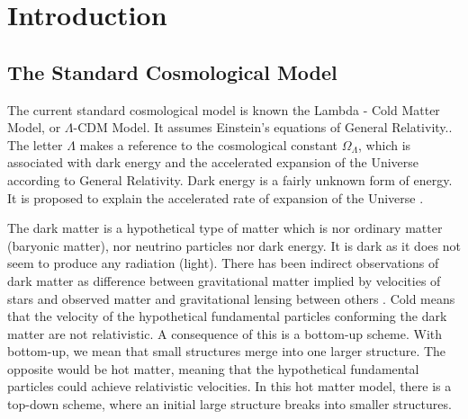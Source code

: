 \documentclass[12pt]{article}
\begin{document}
\section{Introduction}
\subsection{The Standard Cosmological Model}
\label{cosmo_constants}

\begin{par}

The current standard cosmological model is known the Lambda
 - Cold Matter Model, or $\Lambda$-CDM Model. It assumes Einstein's equations of General Relativity.\cite{bertone_particle_2005}.\\
The
  letter $\Lambda$ makes a reference to the
   cosmological constant $\Omega_{\Lambda}$, which is
    associated with dark energy and the accelerated
     expansion of the Universe according to General
      Relativity. Dark energy is a fairly unknown form of
       energy. It is proposed to explain the accelerated
        rate of expansion of the Universe
         \cite{peebles_cosmological_2003}.
      
The dark matter is a hypothetical type of matter which is
 nor ordinary matter (baryonic matter), nor neutrino
  particles nor dark energy. It is dark as it does not
   seem to produce any radiation (light). There has been
    indirect observations of dark matter as difference
     between gravitational matter implied by velocities
      of stars and observed matter and gravitational
       lensing between others
        \cite{trimble_existence_1987}. Cold means that
         the velocity of the hypothetical fundamental
          particles conforming the dark matter are not
           relativistic. A consequence of this is a
            bottom-up scheme. With bottom-up, we mean
             that small structures merge into one larger
              structure. The opposite would be hot
               matter, meaning that the hypothetical
                fundamental particles could achieve
                 relativistic velocities. In this hot
                  matter model, there is a top-down
                   scheme,
    where an initial large structure breaks into smaller
     structures. \cite{bertone_particle_2005} \\
      
\end{par}
\end{document}
